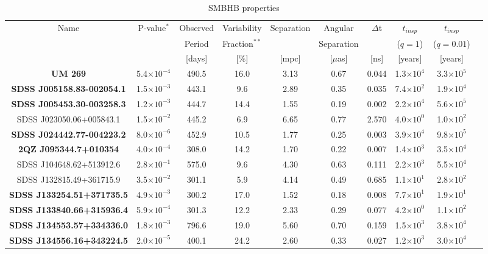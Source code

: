 \begin{table}
\caption{SMBHB properties}
\label{Table:BinaryProperties}
\centering
\begin{tabular}{|c| c| c| c| c| c| c| c| c|c|}
\hline
Name		&P-value$^*$	&Observed 		&Variability				&Separation		&Angular  		&$\Delta$t	&	$t_{insp}$		&	$t_{insp}$ \\
				&					&Period	  		&Fraction$^{**}$				&						&Separation		&					&	($q=1$)		&	($q=0.01$) \\
				&					&[days]		  		&[$\%$]					& [mpc]			&[$\mu$as]		&[ns]			&	[years] 			&	[years] \\
\hline\hline
\textbf{UM 269}                  					&	5.4$\times 10^{-4}$		&490.5			&16.0	&3.13		&0.67		&0.044		&1.3$\times 10^4$		&	3.3$\times 10^5$\\
\textbf{SDSS J005158.83-002054.1} 	& 1.5$\times 10^{-3}$		&443.1		 	&9.6		&2.89		&0.35		&0.035		&7.4$\times 10^2$		&	1.9$\times 10^4$\\
\textbf{SDSS J005453.30-003258.3}	& 1.2$\times 10^{-3}$ 		&444.7			&14.4	&1.55		&0.19		&0.002		&2.2$\times 10^4$		&	5.6$\times 10^5$\\
SDSS J023050.06+005843.1 	& 1.5$\times 10^{-2}$		&445.2			&6.9		&6.65		&0.77		&2.570		&4.0$\times 10^0$		&	1.0$\times 10^2$\\
\textbf{SDSS J024442.77-004223.2} 	&	8.0$\times 10^{-6}$		&452.9			&10.5	&1.77		&0.25		&0.003		&3.9$\times 10^4$		&	9.8$\times 10^5$\\
\textbf{2QZ J095344.7+010354}     	&	4.0$\times 10^{-4}$		&308.0			&14.2	&1.70		&0.22		&0.007		&1.4$\times 10^3$		&	3.5$\times 10^4$\\
SDSS J104648.62+513912.6 	&	2.8$\times 10^{-1}$		&575.0			&9.6		&4.30		&0.63		&0.111		&2.2$\times 10^3$		&	5.5$\times 10^4$\\
SDSS J132815.49+361715.9 	&	3.5$\times 10^{-2}$		&301.1			&5.9		&4.14		&0.49		&0.685		&1.1$\times 10^1$		&	2.8$\times 10^2$\\
\textbf{SDSS J133254.51+371735.5} 	&	4.9$\times 10^{-3}$		&300.2			&17.0	&1.52		&0.18		&0.008		&7.7$\times 10^1$		&	1.9$\times 10^1$\\
\textbf{SDSS J133840.66+315936.4} 	&	5.9$\times 10^{-4}$		&301.3			&12.2	&2.33		&0.29		&0.077		&4.2$\times 10^0$		&	1.1$\times 10^2$\\
\textbf{SDSS J134553.57+334336.0} 	&	1.8$\times 10^{-3}$		&796.6			&19.0	&5.60		&0.70		&0.159		&1.5$\times 10^3$		&	3.8$\times 10^4$\\
\textbf{SDSS J134556.16+343224.5} 	&	2.0$\times 10^{-5}$		&400.1			&24.2	&2.60		&0.33		&0.027		&1.2$\times 10^3$		&	3.0$\times 10^4$\\

\end{tabular}
\end{table}
